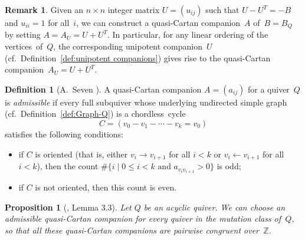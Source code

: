\documentclass[11pt, letterpaper]{amsart}
\newtheorem{proposition}[theorem]{Proposition}
\theoremstyle{definition}
\newtheorem{remark}[theorem]{Remark}
\newtheorem{definition}[theorem]{Definition}
\numberwithin{equation}{section}
\def\ZZ{{\mathbb Z}}
\begin{document}
\begin{remark}
Given an $n\times n$ integer matrix $U=(u_{ij})$ such that $U - U^T = -B$ and $u_{ii}=1$ for all~$i$, 
we can construct a quasi-Cartan companion~$A$ of~$B=B_Q$ by setting $A=A_U = U+U^T$.
In particular, for any linear ordering of the vertices~of~$Q$, the corresponding unipotent companion~$U$ 
(cf.\ Definition~\ref{def:unipotent companions}) gives rise to the quasi-Cartan companion~$A_U= U+U^T$. 
\end{remark}


\begin{definition}[A.~Seven \cite{SevenAMatrices}]
\label{def:admissible quasiCartan}
A quasi-Cartan companion $A=(a_{ij})$ for a quiver~$Q$ is \emph{ad\-missible} if 
every full subquiver whose underlying undirected simple graph (cf.\ Definition~\ref{def:Graph-Q}) 
is a chordless~cycle 
\begin{equation}
\label{eq:cordles--cycle-k}
C = (v_0 - v_1 - \cdots - v_k=v_0)
\end{equation}
satisfies the following conditions: 
\begin{itemize}
\item if $C$ is oriented (that is, either $v_i \rightarrow v_{i+1}$ for all $i<k$ or $v_i \leftarrow v_{i+1}$ for all $i<k$), 
then the count $\#\{i\mid 0 \leq i < k \text{ and } a_{v_i v_{i+1}}>0\}$ is odd; 
\item if $C$ is not oriented, then this count is even. 
\end{itemize}
\end{definition}



\begin{proposition}[\cite{SevenAMatrices}, Lemma 3.3]
\label{prop:Seven acyclic catchy}
Let $Q$ be an acyclic quiver.
We can choose an admissible quasi-Cartan companion for every quiver in the mutation class of~$Q$, 
so that all these quasi-Cartan companions are pairwise congruent over~$\ZZ$.
\end{proposition}
\end{document}
